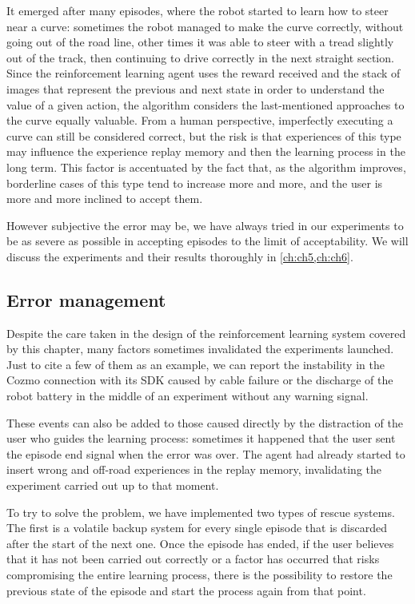 It emerged after many episodes, where the robot started to learn how to steer near a curve: sometimes the robot managed to make the curve correctly, without going out of the road line, other times it was able to steer with a tread slightly out of the track, then continuing to drive correctly in the next straight section.
Since the reinforcement learning agent uses the reward received and the stack of images that represent the previous and next state in order to understand the value of a given action, the algorithm considers the last-mentioned approaches to the curve equally valuable.
From a human perspective, imperfectly executing a curve can still be considered correct, but the risk is that experiences of this type may influence the experience replay memory and then the learning process in the long term.
This factor is accentuated by the fact that, as the algorithm improves, borderline cases of this type tend to increase more and more, and the user is more and more inclined to accept them.

However subjective the error may be, we have always tried in our experiments to be as severe as possible in accepting episodes to the limit of acceptability.
We will discuss the experiments and their results thoroughly in \vref{ch:ch5,ch:ch6}.

\subsection{Error management} \label{subsec:error-management}

Despite the care taken in the design of the reinforcement learning system covered by this chapter, many factors sometimes invalidated the experiments launched.
Just to cite a few of them as an example, we can report the instability in the Cozmo connection with its SDK caused by cable failure or the discharge of the robot battery in the middle of an experiment without any warning signal.

These events can also be added to those caused directly by the distraction of the user who guides the learning process: sometimes it happened that the user sent the episode end signal when the error was over.
The agent had already started to insert wrong and off-road experiences in the replay memory, invalidating the experiment carried out up to that moment.

To try to solve the problem, we have implemented two types of rescue systems.
The first is a volatile backup system for every single episode that is discarded after the start of the next one.
Once the episode has ended, if the user believes that it has not been carried out correctly or a factor has occurred that risks compromising the entire learning process, there is the possibility to restore the previous state of the episode and start the process again from that point.

